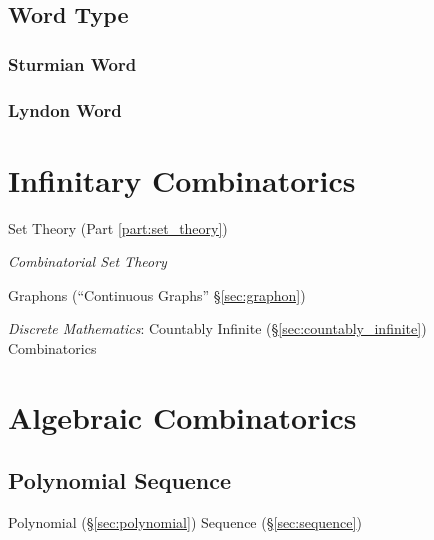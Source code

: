 \subsection{Word Type}\label{sec:word_type}

\subsubsection{Sturmian Word}\label{sec:sturmian_word}

\subsubsection{Lyndon Word}\label{sec:lyndon_word}



\section{Infinitary Combinatorics}\label{sec:infinitary_combinatorics}

Set Theory (Part \ref{part:set_theory})

\emph{Combinatorial Set Theory}

Graphons (``Continuous Graphs'' \S\ref{sec:graphon})

\emph{Discrete Mathematics}: Countably Infinite (\S\ref{sec:countably_infinite})
Combinatorics



\section{Algebraic Combinatorics}\label{sec:algebraic_combinatorics}

\subsection{Polynomial Sequence}\label{sec:polynomial_sequence}

Polynomial (\S\ref{sec:polynomial}) Sequence (\S\ref{sec:sequence})

